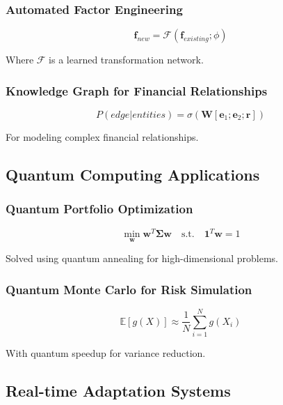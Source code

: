 \documentclass[11pt,letterpaper]{book}
\newcommand{\E}{\mathbb{E}}
\begin{document}
\subsubsection{Automated Factor Engineering}

\begin{equation}
\mathbf{f}_{new} = \mathcal{F}(\mathbf{f}_{existing}; \phi)
\end{equation}

Where $\mathcal{F}$ is a learned transformation network.

\subsubsection{Knowledge Graph for Financial Relationships}

\begin{equation}
P(edge | entities) = \sigma(\mathbf{W} [\mathbf{e}_1; \mathbf{e}_2; \mathbf{r}])
\end{equation}

For modeling complex financial relationships.

\subsection{Quantum Computing Applications}

\subsubsection{Quantum Portfolio Optimization}

\begin{equation}
\min_{\mathbf{w}} \mathbf{w}^T \boldsymbol{\Sigma} \mathbf{w} \quad \text{s.t.} \quad \mathbf{1}^T \mathbf{w} = 1
\end{equation}

Solved using quantum annealing for high-dimensional problems.

\subsubsection{Quantum Monte Carlo for Risk Simulation}

\begin{equation}
\E[g(X)] \approx \frac{1}{N} \sum_{i=1}^N g(X_i)
\end{equation}

With quantum speedup for variance reduction.

\subsection{Real-time Adaptation Systems}
\end{document}
